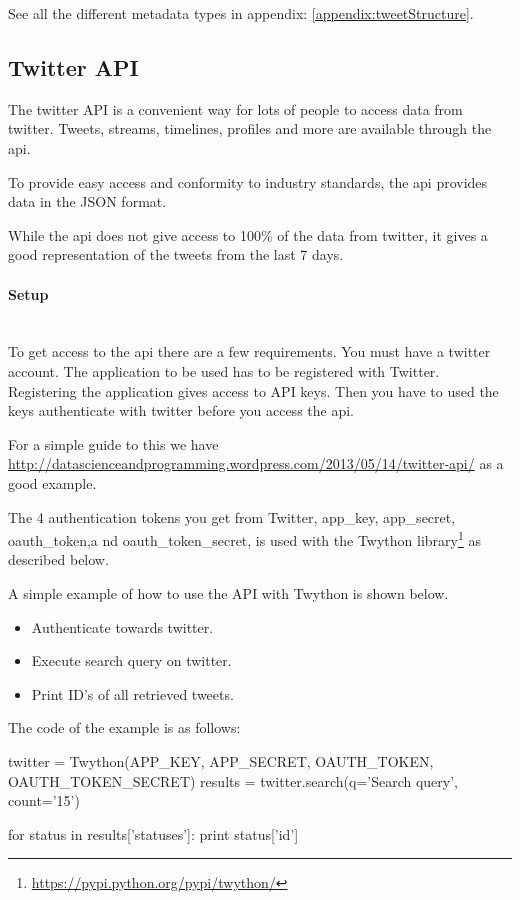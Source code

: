 See all the different metadata types in appendix: \ref{appendix:tweetStructure}.
%

\subsection{Twitter API}
The twitter API is a convenient way for lots of people to access data from
twitter. Tweets, streams, timelines, profiles and more are available through
the api. 

To provide easy access and conformity to industry standards, the api
provides data in the JSON format. 

While the api does not give access to 100\% of the data from twitter, it gives
a good representation of the tweets from the last 7 days.
%

\paragraph{Setup}
\hspace{0pt}\\
To get access to the api there are a few requirements. You must have a
twitter account. The application to be used has to be registered with Twitter.
Registering the application gives access to API keys. Then you have to used the
keys authenticate with twitter before you access the api. 

For a simple guide to this we have
\url{http://datascienceandprogramming.wordpress.com/2013/05/14/twitter-api/} as
a good example.

The 4 authentication tokens you get from Twitter, app\_key, app\_secret, oauth\_token,a nd
oauth\_token\_secret, is used with the Twython
library\footnote{\url{https://pypi.python.org/pypi/twython/}} as described
below.

A simple example of how to use the API with Twython is shown below. 
\begin{itemize}
	\item Authenticate towards twitter.
	\item Execute search query on twitter.
	\item Print ID's of all retrieved tweets.
\end{itemize} 

The code of the example is as follows:
\begin{python}
twitter = Twython(APP_KEY, APP_SECRET, OAUTH_TOKEN, OAUTH_TOKEN_SECRET)
results = twitter.search(q='Search query', count='15')

for status in results['statuses']:
    print status['id']
\end{python}

